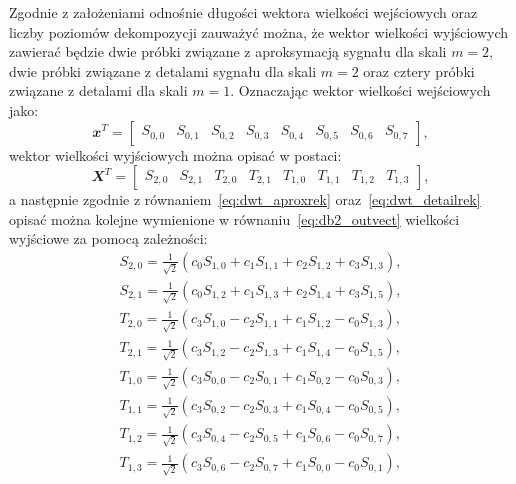 Zgodnie z założeniami odnośnie długości wektora wielkości wejściowych oraz liczby poziomów dekompozycji zauważyć można, że wektor wielkości wyjściowych zawierać będzie dwie próbki związane z aproksymacją sygnału dla skali $m = 2$, dwie próbki związane z detalami sygnału dla skali $m = 2$ oraz cztery próbki związane z detalami dla skali $m = 1$. Oznaczając wektor wielkości wejściowych jako:
\begin{equation}
\mathbfit{x}^{T} =
\begin{bmatrix}
S_{0,0} & S_{0,1} & S_{0,2} & S_{0,3} & S_{0,4} & S_{0,5} & S_{0,6} & S_{0,7}
\end{bmatrix}
\label{eq:db2_invect},
\end{equation}
wektor wielkości wyjściowych można opisać w postaci:
\begin{equation}
\mathbfit{X}^{T} =
\begin{bmatrix}
S_{2,0} & S_{2,1} & T_{2,0} & T_{2,1} & T_{1,0} & T_{1,1} & T_{1,2} & T_{1,3}
\end{bmatrix}
\label{eq:db2_outvect},
\end{equation}
a następnie zgodnie z równaniem~\eqref{eq:dwt_aproxrek} oraz~\eqref{eq:dwt_detailrek} opisać można kolejne wymienione w równaniu~\eqref{eq:db2_outvect} wielkości wyjściowe za pomocą zależności:
\begin{gather}
S_{2,0} = \frac{1}{\sqrt{2}} \left( c_{0} S_{1,0} + c_{1} S_{1,1} + c_{2} S_{1,2} + c_{3} S_{1,3} \right) \label{eq:db2_outvect_s_2_0}, \\
S_{2,1} = \frac{1}{\sqrt{2}} \left( c_{0} S_{1,2} + c_{1} S_{1,3} + c_{2} S_{1,4} + c_{3} S_{1,5} \right) \label{eq:db2_outvect_s_2_1}, \\
T_{2,0} = \frac{1}{\sqrt{2}} \left( c_{3} S_{1,0} - c_{2} S_{1,1} + c_{1} S_{1,2} - c_{0} S_{1,3} \right) \label{eq:db2_outvect_t_2_0}, \\
T_{2,1} = \frac{1}{\sqrt{2}} \left( c_{3} S_{1,2} - c_{2} S_{1,3} + c_{1} S_{1,4} - c_{0} S_{1,5} \right) \label{eq:db2_outvect_t_2_1}, \\
T_{1,0} = \frac{1}{\sqrt{2}} \left( c_{3} S_{0,0} - c_{2} S_{0,1} + c_{1} S_{0,2} - c_{0} S_{0,3} \right) \label{eq:db2_outvect_t_1_0}, \\
T_{1,1} = \frac{1}{\sqrt{2}} \left( c_{3} S_{0,2} - c_{2} S_{0,3} + c_{1} S_{0,4} - c_{0} S_{0,5} \right) \label{eq:db2_outvect_t_1_1}, \\
T_{1,2} = \frac{1}{\sqrt{2}} \left( c_{3} S_{0,4} - c_{2} S_{0,5} + c_{1} S_{0,6} - c_{0} S_{0,7} \right) \label{eq:db2_outvect_t_1_2}, \\
T_{1,3} = \frac{1}{\sqrt{2}} \left( c_{3} S_{0,6} - c_{2} S_{0,7} + c_{1} S_{0,0} - c_{0} S_{0,1} \right) \label{eq:db2_outvect_t_1_3},
\end{gather}
